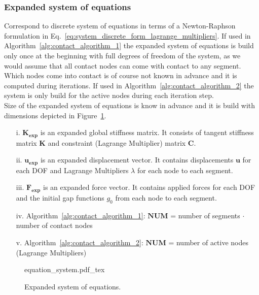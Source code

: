 \documentclass[10pt,a4paper]{article}
\begin{document}
\subsubsection{Expanded system of equations}

Correspond to discrete system of equations in terms of a Newton-Raphson formulation in Eq.~\eqref{eq:system_discrete_form_lagrange_multipliers}. If used in Algorithm~\ref{alg:contact_algorithm_1} the expanded system of equations is build only once at the beginning with full degrees of freedom of the system, as we would assume that all contact nodes can come with contact to any segment. Which nodes come into contact is of course not known in advance and it is computed during iterations. If used in Algorithm~\ref{alg:contact_algorithm_2} the system is only build for the active nodes during each iteration step. \\

Size of the expanded system of equations is know in advance and it is build with dimensions depicted in Figure~\ref{im:expanded_system}.

\begin{itemize}

	\item[i.] $\mathbf{K_{exp}}$ is an expanded global stiffness matrix. It consists of tangent stiffness matrix $\mathbf{K}$ and constraint (Lagrange Multiplier) matrix $\mathbf{C}$.
	
	\item[ii.] $\mathbf{u_{exp}}$ is an expanded displacement vector. It contains displacements $\mathbf{u}$ for each DOF and Lagrange Multipliers $\lambda$ for each node to each segment.
	
	\item[iii.] $\mathbf{F_{exp}}$ is an expanded force vector. It contains applied forces for each DOF and the initial gap functions $g_0$ from each node to each segment.
	
	\item[iv.] Algorithm~\ref{alg:contact_algorithm_1}: $\mathbf{NUM}$ = number of segments $\mathbf{\cdot}$ number of contact nodes
	
	\item[v.] Algorithm~\ref{alg:contact_algorithm_2}: $\mathbf{NUM}$ = number of active nodes (Lagrange Multipliers)

\end{itemize}

\begin{figure}[ht]
	\centering
	\footnotesize
    \def\svgwidth{0.8\textwidth}{equation_system.pdf_tex}
	\caption{Expanded system of equations.}
	\label{im:expanded_system}
\end{figure}
\end{document}
